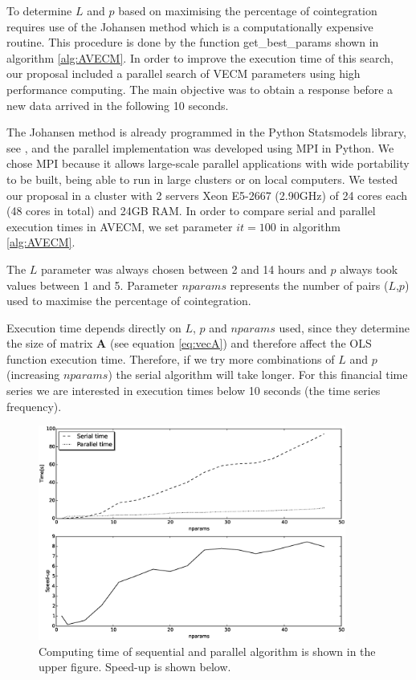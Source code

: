 To determine $L$ and $p$ based on maximising the percentage of cointegration
requires use of the Johansen method which is a computationally expensive
routine. This procedure is done by the function
get\_best\_params shown in algorithm \ref{alg:AVECM}.  In
order to improve the execution time of this search, our proposal included a
parallel search of VECM parameters using high performance computing.  The main
objective was to obtain a response before a new data arrived in the following 10
seconds.

The Johansen method is already programmed in the Python Statsmodels
library, see \cite{seabold2010}, and the parallel implementation was developed using
MPI in Python.  We chose MPI because it allows large-scale parallel applications
with wide portability to be built, being able to run in large clusters or on
local computers.  We tested our proposal in a cluster with 2 servers Xeon
E5-2667 (2.90GHz) of 24 cores each (48 cores in total) and 24GB RAM.  In order
to compare serial and parallel execution times in AVECM, we set parameter
$it=100$ in algorithm \ref{alg:AVECM}.

The $L$ parameter was always chosen between 2 and 14 hours and $p$ always took
values between 1 and 5. Parameter $nparams$ represents the number of pairs
($L$,$p$) used to maximise the percentage of cointegration. 

Execution time depends directly on $L$, $p$ and $nparams$ used, since they
determine the size of matrix $\mathbf{A}$ (see equation \ref{eq:vecA}) and
therefore affect the OLS function execution time.  Therefore, if we try more
combinations of $L$ and $p$ (increasing $nparams$) the serial algorithm will
take longer. For this financial time series we are interested in execution times
below 10 seconds  (the time series frequency).

\begin{figure}[ht]
  \centering
  \includegraphics[width=0.9\textwidth]{img/51_Fig3}
  \caption{Computing time of sequential and parallel algorithm is shown in the
  upper figure. Speed-up is shown below.}
  \label{fig:extimes}
\end{figure}

